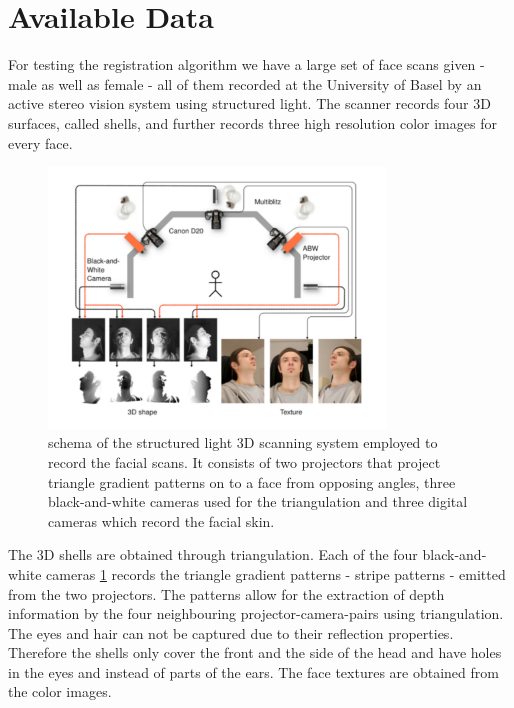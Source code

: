 \section{Available Data}
For testing the registration algorithm we have a large set of face scans given - male as well as female - all of them recorded at the University of Basel by an active stereo vision system using structured light. The scanner records four 3D surfaces, called shells, and further records three high resolution color images for every face. 
\begin{figure}[h!]
\centering
\includegraphics[width=0.8\textwidth]{./resources/figures/scanner.pdf}
\caption{schema of the structured light 3D scanning system employed to record the facial scans. It consists of two projectors that project triangle gradient patterns on to a face from opposing angles, three black-and-white cameras used for the triangulation and three digital cameras which record the facial skin.}
\label{fig:scanner}
\end{figure}
The 3D shells are obtained through triangulation.
Each of the four black-and-white cameras \ref{fig:scanner} records the triangle gradient patterns - stripe patterns - emitted from the two projectors. The patterns allow for the extraction of depth information by the four neighbouring projector-camera-pairs using triangulation.  
The eyes and hair can not be captured due to their reflection properties. Therefore the shells only cover the front and the side of the head and have holes in the eyes and instead of parts of the ears. 
The face textures are obtained from the color images.
